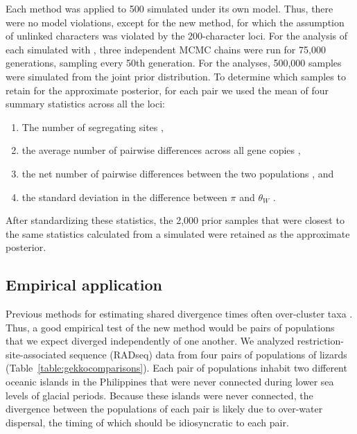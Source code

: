 Each method was applied to 500 \datasets simulated under its own model.
Thus, there were no model violations, except for the new method, for which the
assumption of unlinked characters was violated by the 200-character loci.
For the analysis of each simulated \dataset with \ecoevolity, three independent
MCMC chains were run for 75,000 generations, sampling every 50th generation.
For the \dppmsbayes analyses, 500,000 samples were simulated from the joint
prior distribution.
To determine which samples to retain for the approximate posterior, for each
pair we used the mean of four summary statistics across all the loci:
\begin{enumerate}
    \item The number of segregating sites \citep[$\theta_W$;][]{Watterson1975},
    \item the average number of pairwise differences across all gene copies
        \citep[$\pi$;][]{NeiLi1979},
    \item the net number of pairwise differences between the two populations
        \citep[Equation 25 in][]{NeiLi1979}, and
    \item the standard deviation in the difference between $\pi$ and $\theta_W$
        \citep{Tajima1989}.
\end{enumerate}
After standardizing these statistics, the 2,000 prior samples that were closest
to the same statistics calculated from a simulated \dataset were retained as
the approximate posterior.

\subsection{Empirical application}
Previous methods for estimating shared divergence times often over-cluster taxa
\citep{Oaks2012,Oaks2014reply}.
Thus, a good empirical test of the new method would be pairs of populations
that we expect diverged independently of one another.
We analyzed restriction-site-associated sequence (RADseq) data from four pairs
of populations of  lizards
(Table~\ref{table:gekkocomparisons}).
Each pair of populations inhabit two different oceanic islands in the
Philippines that were never connected during lower sea levels of glacial
periods.
Because these islands were never connected, the divergence between the
populations of each pair is likely due to over-water dispersal, the timing of
which should be idiosyncratic to each pair.

\ifembed{

}{}

